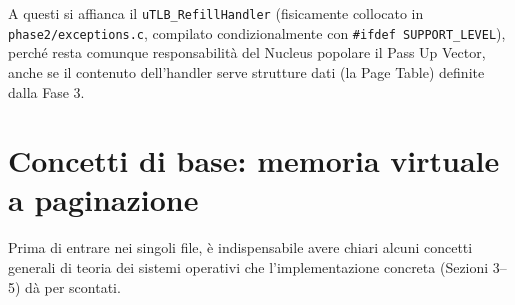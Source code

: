 \documentclass[11pt,a4paper]{article}
\newcommand{\code}[1]{\texttt{#1}}
\begin{document}
A questi si affianca il \code{uTLB\_RefillHandler} (fisicamente collocato in
\code{phase2/exceptions.c}, compilato condizionalmente con
\code{\#ifdef SUPPORT\_LEVEL}), perché resta comunque responsabilità del
Nucleus popolare il Pass Up Vector, anche se il contenuto dell'handler serve
strutture dati (la Page Table) definite dalla Fase 3.

\section{Concetti di base: memoria virtuale a paginazione}

Prima di entrare nei singoli file, è indispensabile avere chiari alcuni
concetti generali di teoria dei sistemi operativi che l'implementazione
concreta (Sezioni 3--5) dà per scontati.
\end{document}
